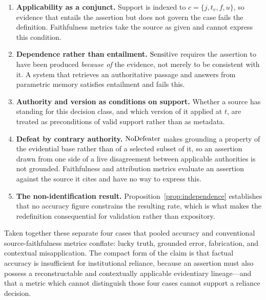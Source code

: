 \begin{enumerate}
  \item \textbf{Applicability as a conjunct.} Support is indexed to
        $c = \{j, t_v, f, u\}$, so evidence that entails the assertion but does not
        govern the case fails the definition. Faithfulness metrics take the source as
        given and cannot express this condition.
  \item \textbf{Dependence rather than entailment.} $\operatorname{Sensitive}$ requires the
        assertion to have been produced \emph{because of} the evidence, not merely to
        be consistent with it. A system that retrieves an authoritative passage and
        answers from parametric memory satisfies entailment and fails this.
  \item \textbf{Authority and version as conditions on support.} Whether a source has
        standing for this decision class, and which version of it applied at $t$, are
        treated as preconditions of valid support rather than as metadata.
  \item \textbf{Defeat by contrary authority.} $\operatorname{NoDefeater}$ makes grounding a
        property of the evidential base rather than of a selected subset of it, so an
        assertion drawn from one side of a live disagreement between applicable
        authorities is not grounded. Faithfulness and attribution metrics evaluate an
        assertion against the source it cites and have no way to express this.
  \item \textbf{The non-identification result.} Proposition~\ref{prop:independence}
        establishes that no accuracy figure constrains the resulting rate, which is
        what makes the redefinition consequential for validation rather than
        expository.
\end{enumerate}

Taken together these separate four cases that pooled accuracy and conventional
source-faithfulness metrics conflate: lucky truth, grounded error, fabrication, and
contextual misapplication. The compact form of the claim is that factual accuracy is
insufficient for institutional reliance, because an assertion must also possess a
reconstructable and contextually applicable evidentiary lineage---and that a metric
which cannot distinguish those four cases cannot support a reliance decision.


